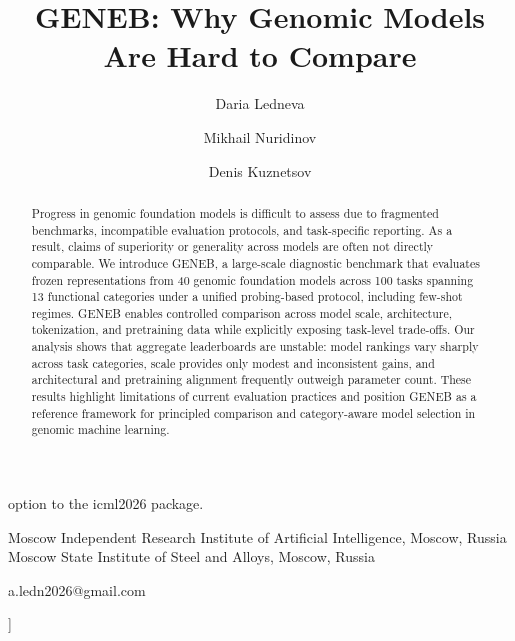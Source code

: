 \documentclass{llmxive}
\title{GENEB: Why Genomic Models Are Hard to Compare}
\author{Daria Ledneva \and Mikhail Nuridinov \and Denis Kuznetsov}
\begin{document}
\maketitle
\begin{abstract}
Progress in genomic foundation models is difficult to assess due to fragmented benchmarks, incompatible evaluation protocols, and task-specific reporting. As a result, claims of superiority or generality across models are often not directly comparable. We introduce GENEB, a large-scale diagnostic benchmark that evaluates frozen representations from 40 genomic foundation models across 100 tasks spanning 13 functional categories under a unified probing-based protocol, including few-shot regimes. GENEB enables controlled comparison across model scale, architecture, tokenization, and pretraining data while explicitly exposing task-level trade-offs. Our analysis shows that aggregate leaderboards are unstable: model rankings vary sharply across task categories, scale provides only modest and inconsistent gains, and architectural and pretraining alignment frequently outweigh parameter count. These results highlight limitations of current evaluation practices and position GENEB as a reference framework for principled comparison and category-aware model selection in genomic machine learning.
\end{abstract}
option to the icml2026 package.



  

  {Moscow Independent Research Institute of Artificial Intelligence, Moscow,
Russia}
  {
Moscow State Institute of Steel and Alloys, Moscow, Russia}

  {a.ledn2026@gmail.com}

  

  \vskip 0.3in
]
\end{document}
